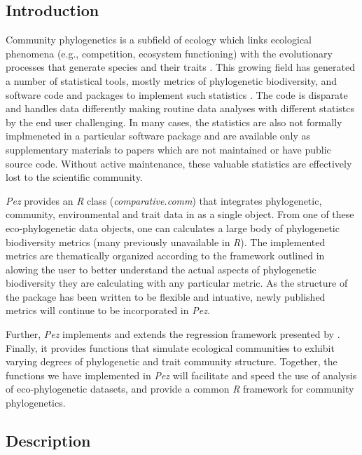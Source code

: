 \documentclass[11pt]{article} %
\begin{document}
\subsection*{Introduction}
Community phylogenetics is a subfield of ecology which links ecological phenomena (e.g., competition, ecosystem functioning)
with the evolutionary processes that generate species and their traits
\autocite[see][]{Webb2002,Cavender-Bares2009}. This growing field has
generated a number of statistical tools, mostly metrics of phylogenetic biodiversity, and software code and packages to implement such statistics
\autocite[notably][]{Webb2008,Regetz2009,Kembel2010,Orme2013,Eastman2013}. The code is disparate and handles data differently 
making routine data analyses with different statistcs by the end user challenging. In many cases, the statistics are also not formally implmeneted in a particular software package and are available only as supplementary materials to papers which are not
maintained or have public source code. Without active maintenance, these valuable statistics are effectively lost to
the scientific community.

\emph{Pez} provides an \emph{R} class (\emph{comparative.comm}) that
integrates phylogenetic, community, environmental and trait data in as
a single object. From one of these eco-phylogenetic data objects, one can calculates a large body of phylogenetic biodiversity metrics (many
previously unavailable in \emph{R}). The implemented metrics are thematically organized according to the framework outlined in \textcite{Pearse2014review} alowing the user to better understand the actual aspects of phylogenetic biodiversity they are calculating with any particular metric. As the structure of the package has been written to be flexible and intuative, newly published metrics will continue to be incorporated in \emph{Pez}. 

Further, \emph{Pez} implements and extends the regression framework presented
by \parencite{Cavender-Bares2004} \autocite[see
also][]{Cavender-Bares2006}. Finally, it provides functions that simulate ecological communities to exhibit varying degrees of phylogenetic and trait community structure. Together, the functions we have implemented in \emph{Pez} will facilitate and speed the use of analysis of eco-phylogenetic
datasets, and provide a common \emph{R} framework for community phylogenetics.
\subsection*{Description}
\end{document}
